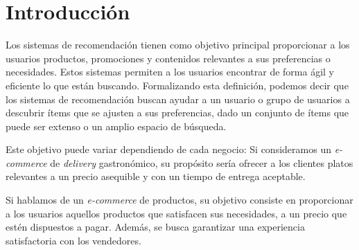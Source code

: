 \documentclass[11pt,a4paper,twoside]{thesis}
\begin{document}

\def\autor{Adrian Norberto Marino}
\def\tituloTesis{Trabajo práctico 2: Búsqueda bibliografica}
\def\runtitulo{Resumen}
\def\runtitle{Trabajo práctico 2: Búqueda bibliografica}


\def\lugar{Buenos Aires, 2023}


%
\frontmatter
\pagestyle{empty}
%
%
%
\tableofcontents
%
%
\mainmatter
\pagestyle{headings}
%
%
%
%


\chapter{Introducción}

Los sistemas de recomendación tienen como objetivo principal proporcionar a los
usuarios productos, promociones y contenidos relevantes a sus preferencias o
necesidades. Estos sistemas permiten a los usuarios encontrar de forma ágil y
eficiente lo que están buscando. Formalizando esta definición, podemos decir
que los sistemas de recomendación buscan ayudar a un usuario o grupo de
usuarios a descubrir ítems que se ajusten a sus preferencias, dado un conjunto
de ítems que puede ser extenso o un amplio espacio de búsqueda.

\begin{sloppypar}
	Este objetivo puede variar dependiendo de cada negocio: Si consideramos un
	\textit{e-commerce} de \textit{delivery} gastronómico, su propósito sería
	ofrecer a los clientes platos relevantes a un precio asequible y con un tiempo
	de entrega aceptable.
\end{sloppypar}

Si hablamos de un \textit{e-commerce} de productos, su objetivo consiste en
proporcionar a los usuarios aquellos productos que satisfacen sus necesidades,
a un precio que estén dispuestos a pagar. Además, se busca garantizar una
experiencia satisfactoria con los vendedores.
\end{document}
